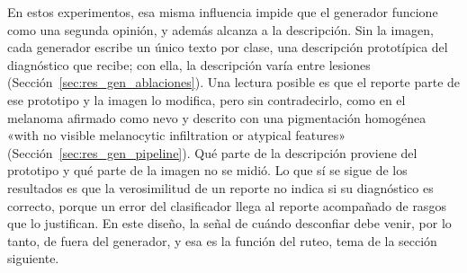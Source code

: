 En estos experimentos, esa misma influencia impide que el generador funcione como una segunda opinión, y además alcanza a la descripción. Sin la
imagen, cada generador escribe un único texto por clase, una descripción prototípica del diagnóstico que
recibe; con ella, la descripción varía entre lesiones (Sección~\ref{sec:res_gen_ablaciones}). Una lectura posible es
que el reporte parte de ese prototipo y la imagen lo modifica, pero sin contradecirlo, como en el melanoma afirmado
como nevo y descrito con una pigmentación homogénea «with no visible melanocytic infiltration or atypical features» (Sección~\ref{sec:res_gen_pipeline}).
Qué parte de la descripción proviene del prototipo y qué parte de la imagen no se midió. Lo que sí se sigue de los
resultados es que la verosimilitud de un reporte no indica si su diagnóstico es correcto, porque un error del
clasificador llega al reporte acompañado de rasgos que lo justifican. En este diseño, la señal de cuándo desconfiar debe venir, por lo tanto, de fuera del generador, y esa es la función del ruteo, tema de la sección siguiente.
